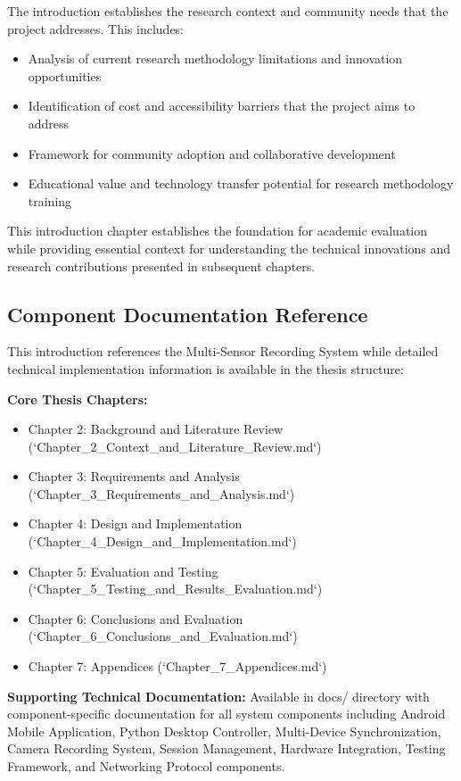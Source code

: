 \documentclass[11pt,a4paper]{article}
\begin{document}
The introduction establishes the research context and community needs that the
project addresses.  This includes:

\begin{itemize}
\item Analysis of current research methodology limitations and innovation opportunities
\item Identification of cost and accessibility barriers that the project aims to address
\item Framework for community adoption and collaborative development
\item Educational value and technology transfer potential for research methodology training

\end{itemize}
This introduction chapter establishes the foundation for academic evaluation
while providing essential
context for understanding the technical innovations and research contributions
presented in subsequent chapters.

\subsection{Component Documentation Reference}

This introduction references the Multi-Sensor Recording System while
detailed technical implementation
information is available in the thesis structure:

\textbf{Core Thesis Chapters:}

\begin{itemize}
\item Chapter 2: Background and Literature Review (`Chapter_2_Context_and_Literature_Review.md`)
\item Chapter 3: Requirements and Analysis (`Chapter_3_Requirements_and_Analysis.md`)
\item Chapter 4: Design and Implementation (`Chapter_4_Design_and_Implementation.md`)
\item Chapter 5: Evaluation and Testing (`Chapter_5_Testing_and_Results_Evaluation.md`)
\item Chapter 6: Conclusions and Evaluation (`Chapter_6_Conclusions_and_Evaluation.md`)
\item Chapter 7: Appendices (`Chapter_7_Appendices.md`)

\end{itemize}
\textbf{Supporting Technical Documentation:}
Available in docs/ directory with component-specific documentation for
all system components including Android Mobile Application, Python Desktop
Controller, Multi-Device Synchronization,
Camera Recording System, Session Management, Hardware Integration, Testing Framework,
and Networking Protocol
components.
\end{document}
